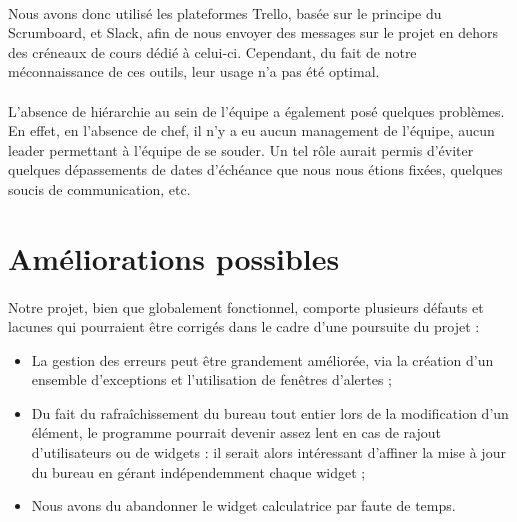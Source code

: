 \paragraph{}
Nous avons donc utilisé les plateformes Trello, basée sur le principe du Scrumboard, et Slack, afin de nous envoyer des messages sur le projet en dehors des créneaux de cours dédié à celui-ci. Cependant, du fait de notre méconnaissance de ces outils, leur usage n'a pas été optimal.

\paragraph{}
L'absence de hiérarchie au sein de l'équipe a également posé quelques problèmes. En effet, en l'absence de chef, il n'y a eu aucun management de l'équipe, aucun leader permettant à l'équipe de se souder. Un tel rôle aurait permis d'éviter quelques dépassements de dates d'échéance que nous nous étions fixées, quelques soucis de communication, etc. 

\section{Améliorations possibles}

\paragraph{}
Notre projet, bien que globalement fonctionnel, comporte plusieurs défauts et lacunes qui pourraient être corrigés dans le cadre d'une poursuite du projet :
\begin{itemize}
	\item La gestion des erreurs peut être grandement améliorée, via la création d'un ensemble d'exceptions et l'utilisation de fenêtres d'alertes ;
	\item Du fait du rafraîchissement du bureau tout entier lors de la modification d'un élément, le programme pourrait devenir assez lent en cas de rajout d'utilisateurs ou de widgets : il serait alors intéressant d'affiner la mise à jour du bureau en gérant indépendemment chaque widget ;
	\item Nous avons du abandonner le widget calculatrice par faute de temps.
\end{itemize}

